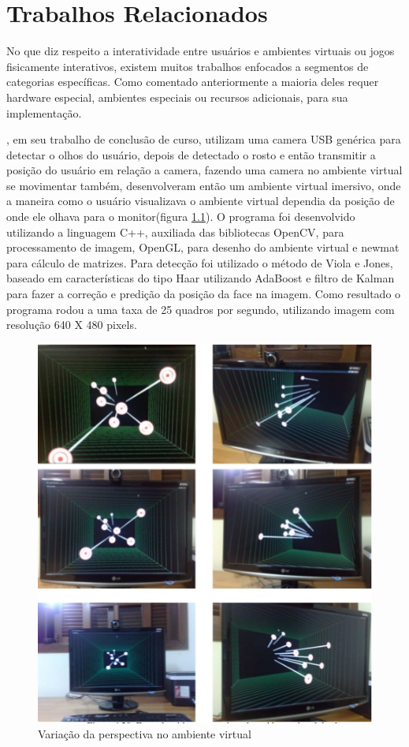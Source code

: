 \chapter{Trabalhos Relacionados}

No que diz respeito a interatividade entre usuários e ambientes virtuais ou jogos fisicamente interativos,
existem muitos trabalhos enfocados a segmentos de categorias específicas. Como comentado anteriormente
a maioria deles requer hardware especial, ambientes especiais ou recursos adicionais, para sua implementação.

\cite{DeteccaoInterface}, em seu trabalho de conclusão de curso, utilizam uma camera USB genérica para detectar
o olhos do usuário, depois de detectado o rosto e então transmitir a posição do usuário em relação a camera,
fazendo uma camera no ambiente virtual se movimentar também, desenvolveram então um ambiente virtual imersivo,
onde a maneira como o usuário visualizava o ambiente virtual dependia da posição de onde ele olhava para o monitor(figura \ref{DeteccaoInterface}).
O programa foi desenvolvido utilizando a linguagem C++, auxiliada das bibliotecas OpenCV, para processamento de imagem,
OpenGL, para desenho do ambiente virtual e newmat para cálculo de matrizes. Para detecção foi utilizado o método de
Viola e Jones, baseado em características do tipo Haar utilizando AdaBoost e filtro de Kalman para fazer a correção
e predição da posição da face na imagem. Como resultado o programa rodou a uma taxa de 25 quadros por segundo,
utilizando imagem com resolução 640 X 480 pixels.

\begin{figure}[h]
    \center
    \includegraphics[scale=1.0]{imagens/DeteccaoInterface.jpg}

    \caption{Variação da perspectiva no ambiente virtual}
    \label{DeteccaoInterface}
\end{figure}

